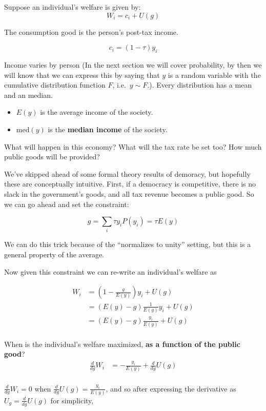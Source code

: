 \documentclass[
]{book}
\providecommand{\tightlist}{%
  \setlength{\itemsep}{0pt}\setlength{\parskip}{0pt}}
\theoremstyle{definition}
\theoremstyle{definition}
\theoremstyle{definition}
\theoremstyle{remark}
\begin{document}
Suppose an individual's welfare is given by:
\[W_i = c_i + U(g)\]

The consumption good is the person's post-tax income.

\[c_i = (1 - \tau) y_i\]

Income varies by person (In the next section we will cover probability, by then we will know that we can express this by saying that \(y\) is a random variable with the cumulative distribution function \(F\), i.e.~\(y \sim F\).). Every distribution has a mean and an median.

\begin{itemize}
\tightlist
\item
  \(E(y)\) is the average income of the society.
\item
  \(\text{med}(y)\) is the \textbf{median income} of the society.
\end{itemize}

What will happen in this economy? What will the tax rate be set too? How much public goods will be provided?

We've skipped ahead of some formal theory results of demoracy, but hopefully these are conceptually intuitive. First, if a democracy is competitive, there is no slack in the government's goods, and all tax revenue becomes a public good. So we can go ahead and set the constraint:

\[g = \sum_{i} \tau y_i P(y_i) = \tau E(y)\]

We can do this trick because of the ``normalizes to unity'' setting, but this is a general property of the average.

Now given this constraint we can re-write an individual's welfare as

\begin{align*}
W_i &= \left(1 - \frac{g}{E(y)}\right)y_i + U(g)\\
&= \left(E(y) - g\right) \frac{1}{E(y)} y_i + U(g)\\
&= \left(E(y) - g\right) \frac{y_i}{E(y)} + U(g)\\
\end{align*}

When is the individual's welfare maximized, \textbf{as a function of the public good}?
\begin{align*}
\frac{d}{dg}W_i &=  - \frac{y_i}{E(y)} + \frac{d}{dg}U(g)\\
\end{align*}

\(\frac{d}{dg}W_i = 0\) when \(\frac{d}{dg}U(g) = \frac{y_i}{E(y)}\), and so after expressing the derivative as \(U_g = \frac{d}{dg}U(g)\) for simplicity,
\end{document}
